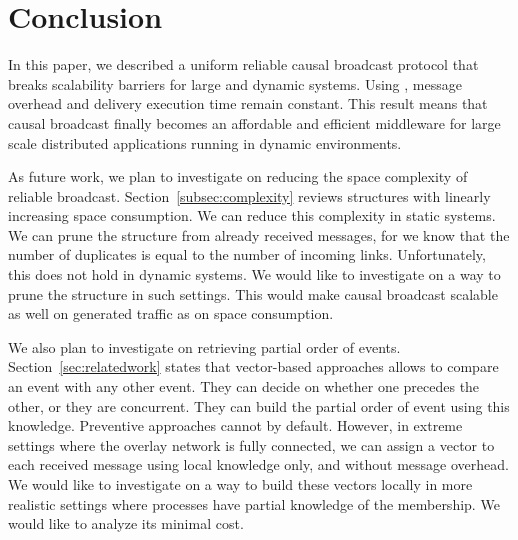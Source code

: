 
\section{Conclusion}
\label{sec:conclusion}

In this paper, we described a uniform reliable causal broadcast protocol that
breaks scalability barriers for large and dynamic systems. Using \CBROADCAST,
message overhead and delivery execution time remain constant.
This result means that causal broadcast finally becomes an affordable and
efficient middleware for large scale distributed applications running in dynamic
environments.

As future work, we plan to investigate on reducing the space complexity of
reliable broadcast. Section~\ref{subsec:complexity} reviews structures with
linearly increasing space consumption. We can reduce this complexity in static
systems. We can prune the structure from already received messages, for we know
that the number of duplicates is equal to the number of incoming
links. Unfortunately, this does not hold in dynamic systems. We would like to
investigate on a way to prune the structure in such settings. This would make
causal broadcast scalable as well on generated traffic as on space consumption.

We also plan to investigate on retrieving partial order of
events. Section~\ref{sec:relatedwork} states that vector-based approaches allows
to compare an event with any other event. They can decide on whether one
precedes the other, or they are concurrent. They can build the partial order of
event using this knowledge. Preventive approaches cannot by default. However, in
extreme settings where the overlay network is fully connected, we can assign a
vector to each received message using local knowledge only, and without message
overhead. We would like to investigate on a way to build these vectors locally
in more realistic settings where processes have partial knowledge of the
membership. We would like to analyze its minimal cost.

